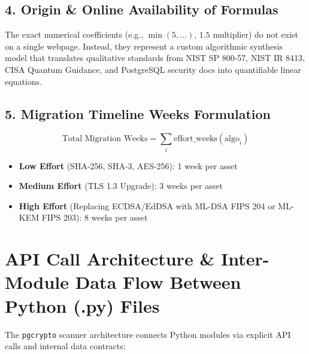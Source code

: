 \documentclass[11pt,a4paper,landscape]{article}
\begin{document}
\subsection{4. Origin \& Online Availability of Formulas}
The exact numerical coefficients (e.g., $\min(5, \dots)$, $1.5$ multiplier) do not exist on a single webpage. Instead, they represent a custom algorithmic synthesis model that translates qualitative standards from NIST SP 800-57, NIST IR 8413, CISA Quantum Guidance, and PostgreSQL security docs into quantifiable linear equations.

\subsection{5. Migration Timeline Weeks Formulation}
\[
\text{Total Migration Weeks} = \sum_{i} \text{effort\_weeks}(\text{algo}_i)
\]
\begin{itemize}
    \item \textbf{Low Effort} (SHA-256, SHA-3, AES-256): 1 week per asset
    \item \textbf{Medium Effort} (TLS 1.3 Upgrade): 3 weeks per asset
    \item \textbf{High Effort} (Replacing ECDSA/EdDSA with ML-DSA FIPS 204 or ML-KEM FIPS 203): 8 weeks per asset
\end{itemize}

\newpage

\section{API Call Architecture \& Inter-Module Data Flow Between Python (.py) Files}

The \texttt{pgcrypto} scanner architecture connects Python modules via explicit API calls and internal data contracts:
\end{document}
